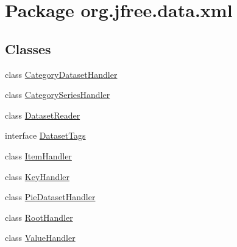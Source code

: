 \hypertarget{namespaceorg_1_1jfree_1_1data_1_1xml}{}\section{Package org.\+jfree.\+data.\+xml}
\label{namespaceorg_1_1jfree_1_1data_1_1xml}
\subsection*{Classes}
\begin{DoxyCompactItemize}
\item 
class \mbox{\hyperlink{classorg_1_1jfree_1_1data_1_1xml_1_1_category_dataset_handler}{Category\+Dataset\+Handler}}
\item 
class \mbox{\hyperlink{classorg_1_1jfree_1_1data_1_1xml_1_1_category_series_handler}{Category\+Series\+Handler}}
\item 
class \mbox{\hyperlink{classorg_1_1jfree_1_1data_1_1xml_1_1_dataset_reader}{Dataset\+Reader}}
\item 
interface \mbox{\hyperlink{interfaceorg_1_1jfree_1_1data_1_1xml_1_1_dataset_tags}{Dataset\+Tags}}
\item 
class \mbox{\hyperlink{classorg_1_1jfree_1_1data_1_1xml_1_1_item_handler}{Item\+Handler}}
\item 
class \mbox{\hyperlink{classorg_1_1jfree_1_1data_1_1xml_1_1_key_handler}{Key\+Handler}}
\item 
class \mbox{\hyperlink{classorg_1_1jfree_1_1data_1_1xml_1_1_pie_dataset_handler}{Pie\+Dataset\+Handler}}
\item 
class \mbox{\hyperlink{classorg_1_1jfree_1_1data_1_1xml_1_1_root_handler}{Root\+Handler}}
\item 
class \mbox{\hyperlink{classorg_1_1jfree_1_1data_1_1xml_1_1_value_handler}{Value\+Handler}}
\end{DoxyCompactItemize}
